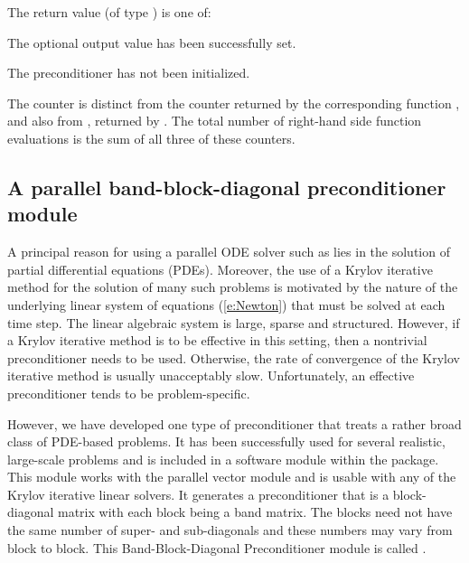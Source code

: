 {
  The return value  (of type ) is one of:
  \begin{args}
  \item[\Id{CVSPILS\_SUCCESS}] 
    The optional output value has been successfully set.
  \item[\Id{CVSPILS\_PMEM\_NULL}]
    The {\cvbandpre} preconditioner has not been initialized.
  \end{args}
}
{
The counter  is distinct from the counter 
returned by the corresponding function , and
also from , returned by .
The total number of right-hand side function evaluations is the
sum of all three of these counters.
}

\subsection{A parallel band-block-diagonal preconditioner module}
\label{sss:cvbbdpre}

A principal reason for using a parallel ODE solver such as {\cvode} lies
in the solution of partial differential equations (PDEs).  Moreover,
the use of a Krylov iterative method for the solution of many such
problems is motivated by the nature of the underlying linear system of
equations (\ref{e:Newton}) that must be solved at each time step.  The
linear algebraic system is large, sparse and structured. However, if
a Krylov iterative method is to be effective in this setting, then a
nontrivial preconditioner needs to be used.  Otherwise, the rate of
convergence of the Krylov iterative method is usually unacceptably
slow.  Unfortunately, an effective preconditioner tends to be
problem-specific.

However, we have developed one type of preconditioner that treats a
rather broad class of PDE-based problems.  It has been successfully
used for several realistic, large-scale problems \cite{HiTa:98} and is
included in a software module within the {\cvode} package. This module
works with the parallel vector module {\nvecp} and is usable with any of
the Krylov iterative linear solvers.  It generates a preconditioner
that is a block-diagonal matrix with each block being a band matrix.
The blocks need not have the same number of super- and sub-diagonals
and these numbers may vary from block to block. This Band-Block-Diagonal
Preconditioner module is called {\cvbbdpre}.

